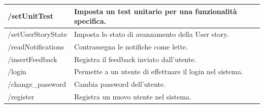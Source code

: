\documentclass{article}
\begin{document}
\begin{center}
\begin{tabular}{|P{7cm}| P{10cm}|}
/setUnitTest & Imposta un test unitario per una funzionalità specifica. \\
\hline
{}
/setUserStoryState & Imposta lo stato di avanzamento della User story. \\
\hline
{}
/readNotifications & Contrassegna le notifiche come lette. \\
\hline
{}
/insertFeedback & Registra il feedback inviato dall'utente. \\
\hline
{}
/login & Permette a un utente di effettuare il login nel sistema. \\
\hline
{}
/change\_password & Cambia password dell'utente. \\
\hline
{}
/register & Registra un nuovo utente nel sistema. \\
\hline
\end{tabular}
\label{tab:lambda}
\end{center}
\end{document}
